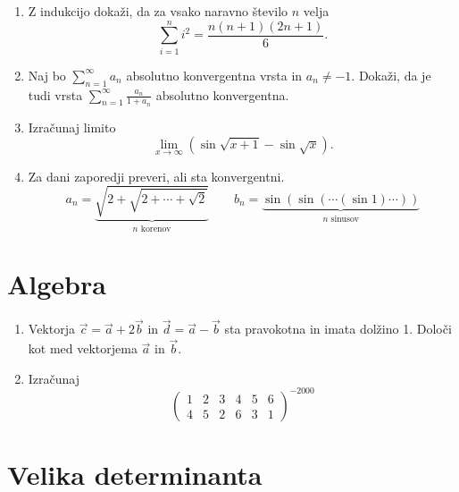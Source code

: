 \documentclass[a4paper,12pt]{article}
\begin{document}
\begin{enumerate}
\item
Z indukcijo dokaži, da za vsako naravno število \(n\) velja
\[
\sum_{i=1}^n i^2 = \frac{n(n+1)(2n+1)}{6}.
\]

\item
Naj bo \(\sum_{n=1}^{\infty} a_n\) absolutno konvergentna vrsta in \(a_n \ne -1\).
Dokaži, da je tudi vrsta \(\sum_{n=1}^\infty \frac{a_n}{1+a_n}\)
absolutno konvergentna.

\item
Izračunaj limito
\[
\lim_{x \to \infty} \left(\sin\sqrt{x+1} - \sin\sqrt{x}\right).
\]

\item
Za dani zaporedji preveri, ali sta konvergentni.
\[
a_n = \underbrace{\sqrt{2+\sqrt{2+\cdots+\sqrt{2}}}}_{n\text{ korenov}}
\qquad
b_n = \underbrace{\sin(\sin(\cdots(\sin 1)\cdots))}_{n\text{ sinusov}}
\]
\end{enumerate}

\section*{Algebra}

\begin{enumerate}
\item
Vektorja \(\vec{c} = \vec{a} + 2\vec{b}\) in
\(\vec{d} = \vec{a} - \vec{b}\)
sta pravokotna in imata dolžino 1. Določi kot med vektorjema \(\vec{a}\) in \(\vec{b}\).

\item
Izračunaj
\[
\left(
\begin{array}{rrrrrr}
1 & 2 & 3 & 4 & 5 & 6 \\
4 & 5 & 2 & 6 & 3 & 1
\end{array}
\right)^{-2000}
\]
\end{enumerate}

\section*{Velika determinanta}
\end{document}
